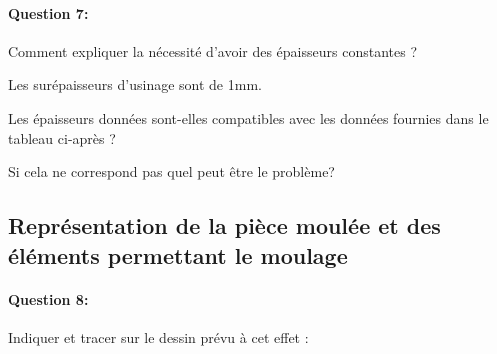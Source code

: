 \paragraph{Question 7:} Comment expliquer la nécessité d'avoir des épaisseurs constantes ?

Les surépaisseurs d'usinage sont de 1mm.

Les épaisseurs données sont-elles compatibles avec les données fournies dans le tableau ci-après ?

Si cela ne correspond pas quel peut être le problème?


\begin{table}[!h]
\begin{center}
\end{center}
\end{table}

\subsection{Représentation de la pièce moulée et des éléments permettant le moulage}

\paragraph{Question 8:} Indiquer et tracer sur le dessin prévu à cet effet :

